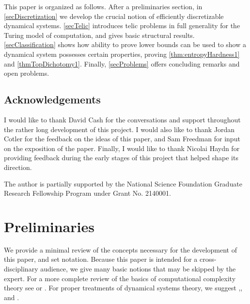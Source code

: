 \documentclass{amsart}
\theoremstyle{theorem}
\theoremstyle{remark}
\numberwithin{equation}{section}
\begin{document}
This paper is organized as follows. After a preliminaries section, in \cref{secDiscretization} we develop the crucial notion of efficiently discretizable dynamical systems.
\cref{secTelic} introduces telic problems in full generality for the Turing model of computation, and gives basic structural results.
\cref{secClassification} shows how ability to prove lower bounds can be used to show a dynamical system possesses certain properties, proving \cref{thm:entropyHardness1} and \cref{thmTopDichotomy1}.
Finally, \cref{secProblems} offers concluding remarks and open problems.



\subsection*{Acknowledgements}
I would like to thank David Cash for the conversations and support throughout the rather long development of this project.
I would also like to thank Jordan Cotler for the feedback on the ideas of this paper, and Sam Freedman for input on the exposition of the paper.
Finally, I would like to thank Nicolai Haydn for providing feedback during the early stages of this project that helped shape its direction.

The author is partially supported by the National Science Foundation Graduate Research Fellowship Program under Grant No. 2140001.




\section{Preliminaries}\label{secPreliminaries}

We provide a minimal review of the concepts necessary for the development of this paper, and set notation. Because this paper is intended for a cross-disciplinary audience, we give many basic notions that may be skipped by the expert. For a more complete review of the basics of computational complexity theory see \cite{arora2009computational} or \cite{papadimitriou}. For proper treatments of dynamical systems theory, we suggest \cite{robinson1998dynamical},\cite{brin2002introduction}, and \cite{walters2000introduction}.
\end{document}
